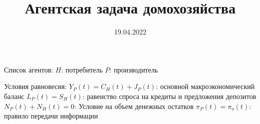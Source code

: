 \documentclass[12pt]{article}
\title{Агентская задача домохозяйства}
\date{19.04.2022}
\begin{document}
Список агентов:
    $H$: потребитель
    $P$: производитель

Условия равновесия:
    $Y_{P}(t) = C_{H}(t) + J_{P}(t)$: основной макроэкономический баланс
    $L_{P}(t) = S_{H}(t)$: равенство спроса на кредиты и предложения депозитов
    $N_{P}(t) + N_{H}(t) = 0$: Условие на объем денежных остатков
    $\pi_{P}(t) = \pi_{o}(t)$: правило передачи информации
\end{document}
